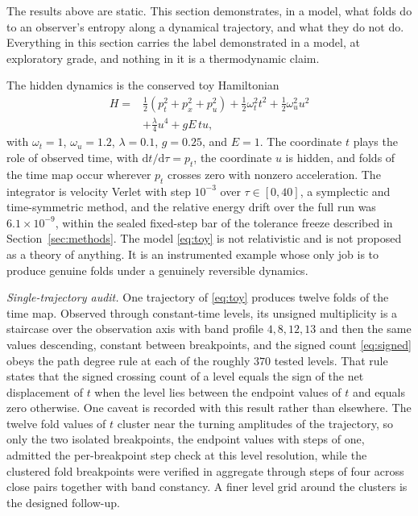 \documentclass[aps,pre,reprint,nofootinbib]{revtex4-2}
\newcommand{\dd}{\mathrm{d}}
\begin{document}
The results above are static.  This section demonstrates, in a model, what
folds do to an observer's entropy along a dynamical trajectory, and what
they do not do.  Everything in this section carries the label demonstrated
in a model, at exploratory grade, and nothing in it is a thermodynamic
claim.

The hidden dynamics is the conserved toy Hamiltonian
\begin{equation}
\begin{split}
  H = {}& \tfrac12\!\left(p_t^2 + p_x^2 + p_u^2\right)
  + \tfrac12 \omega_t^2 t^2
  + \tfrac12 \omega_u^2 u^2 \\
  & + \tfrac{\lambda}{4} u^4
  + g E\, t u,
\end{split}
\label{eq:toy}
\end{equation}
with $\omega_t = 1$, $\omega_u = 1.2$, $\lambda = 0.1$, $g = 0.25$, and
$E = 1$.  The coordinate $t$ plays the role of observed time, with
$\dd t/\dd\tau = p_t$, the coordinate $u$ is hidden, and folds of the time
map occur wherever $p_t$ crosses zero with nonzero acceleration.  The
integrator is velocity Verlet with step $10^{-3}$ over
$\tau \in [0, 40]$, a symplectic and time-symmetric method, and the
relative energy drift over the full run was $6.1 \times 10^{-9}$, within the sealed
fixed-step bar of the tolerance freeze described in
Section~\ref{sec:methods}.  The model \eqref{eq:toy} is not relativistic
and is not proposed as a theory of anything.  It is an instrumented
example whose only job is to produce genuine folds under a genuinely
reversible dynamics.

\emph{Single-trajectory audit.}  One trajectory of \eqref{eq:toy} produces
twelve folds of the time map.  Observed through constant-time levels, its
unsigned multiplicity is a staircase over the observation axis with band
profile $4, 8, 12, 13$ and then the same values descending, constant
between breakpoints, and the signed count \eqref{eq:signed} obeys the path
degree rule at each of the roughly $370$ tested levels.  That rule states
that the signed crossing count of a level equals the sign of the net
displacement of $t$ when the level lies between the endpoint values of $t$
and equals zero otherwise.  One caveat is recorded with this result rather
than elsewhere.  The twelve fold values of $t$ cluster near the turning
amplitudes of the trajectory, so only the two isolated breakpoints, the
endpoint values with steps of one, admitted the per-breakpoint step check
at this level resolution, while the clustered fold breakpoints were
verified in aggregate through steps of four across close pairs together
with band constancy.  A finer level grid around the clusters is the
designed follow-up.
\end{document}

